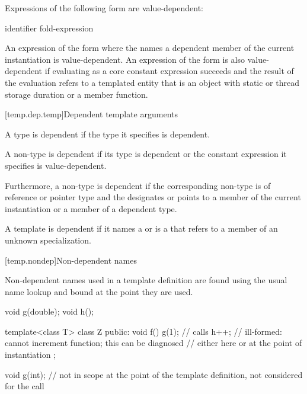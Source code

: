 \pnum
Expressions of the following form are value-dependent:

\begin{ncsimplebnf}
  \terminal{(} identifier \terminal{)}\br
fold-expression
\end{ncsimplebnf}

\pnum
An expression of the form \tcode{\&} where the
 names a dependent member of the current
instantiation is value-dependent.
An expression of the form \tcode{\&}
is also value-dependent if evaluating 
as a core constant expression succeeds and
the result of the evaluation refers to a templated entity
that is an object with static or thread storage duration or a member function.

[temp.dep.temp]{Dependent template arguments}

\pnum
A type
is dependent if the type it specifies is dependent.

\pnum
A non-type
is dependent if its type is dependent or the constant
expression it specifies is value-dependent.

\pnum
Furthermore, a non-type
is dependent if the corresponding non-type 
is of reference or pointer type and the 
designates or points to a member of the current instantiation or a member of
a dependent type.

\pnum
A template
is dependent if it names a
or is a
that refers to a member of an unknown specialization.

[temp.nondep]{Non-dependent names}

\pnum
Non-dependent names used in a template definition are found using the
usual name lookup and bound at the point they are used.
\begin{example}
\begin{codeblock}
void g(double);
void h();

template<class T> class Z {
public:
  void f() {
    g(1);           // calls 
    h++;            // ill-formed: cannot increment function; this can be diagnosed
                    // either here or at the point of instantiation
  }
};

void g(int);        // not in scope at the point of the template definition, not considered for the call 
\end{codeblock}
\end{example}

